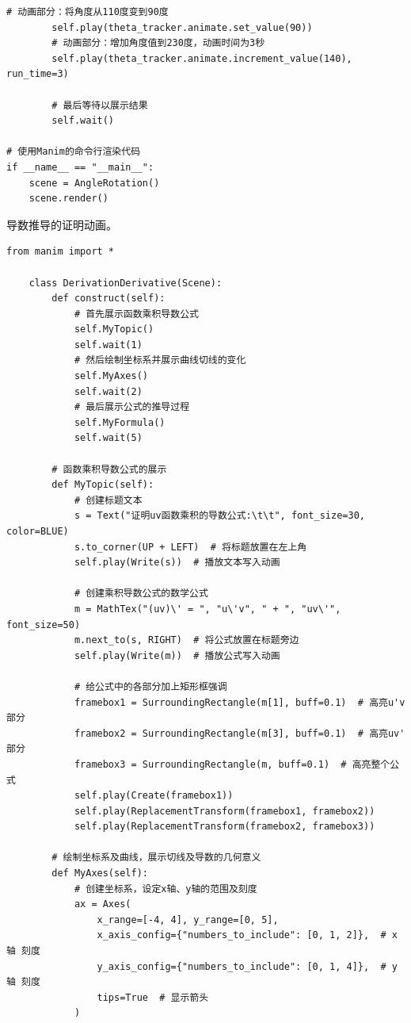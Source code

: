 \begin{lstlisting}[style=pythonstyle]
        # 动画部分：将角度从110度变到90度
        self.play(theta_tracker.animate.set_value(90))
        # 动画部分：增加角度值到230度，动画时间为3秒
        self.play(theta_tracker.animate.increment_value(140), run_time=3)

        # 最后等待以展示结果
        self.wait()

# 使用Manim的命令行渲染代码
if __name__ == "__main__":
    scene = AngleRotation()
    scene.render()
\end{lstlisting}

\begin{example}
    \exProblem
    导数推导的证明动画。
    \exSolution
    \begin{lstlisting}[style=pythonstyle]
    from manim import *

    class DerivationDerivative(Scene):
        def construct(self):
            # 首先展示函数乘积导数公式
            self.MyTopic()
            self.wait(1)
            # 然后绘制坐标系并展示曲线切线的变化
            self.MyAxes()
            self.wait(2)
            # 最后展示公式的推导过程
            self.MyFormula()
            self.wait(5)
    
        # 函数乘积导数公式的展示
        def MyTopic(self):
            # 创建标题文本
            s = Text("证明uv函数乘积的导数公式:\t\t", font_size=30, color=BLUE)
            s.to_corner(UP + LEFT)  # 将标题放置在左上角
            self.play(Write(s))  # 播放文本写入动画
    
            # 创建乘积导数公式的数学公式
            m = MathTex("(uv)\' = ", "u\'v", " + ", "uv\'", font_size=50)
            m.next_to(s, RIGHT)  # 将公式放置在标题旁边
            self.play(Write(m))  # 播放公式写入动画
    
            # 给公式中的各部分加上矩形框强调
            framebox1 = SurroundingRectangle(m[1], buff=0.1)  # 高亮u'v 部分
            framebox2 = SurroundingRectangle(m[3], buff=0.1)  # 高亮uv' 部分
            framebox3 = SurroundingRectangle(m, buff=0.1)  # 高亮整个公 式
            self.play(Create(framebox1))
            self.play(ReplacementTransform(framebox1, framebox2))
            self.play(ReplacementTransform(framebox2, framebox3))
    
        # 绘制坐标系及曲线，展示切线及导数的几何意义
        def MyAxes(self):
            # 创建坐标系，设定x轴、y轴的范围及刻度
            ax = Axes(
                x_range=[-4, 4], y_range=[0, 5],
                x_axis_config={"numbers_to_include": [0, 1, 2]},  # x轴 刻度
                y_axis_config={"numbers_to_include": [0, 1, 4]},  # y轴 刻度
                tips=True  # 显示箭头
            )
    

\end{lstlisting}
\end{example}
